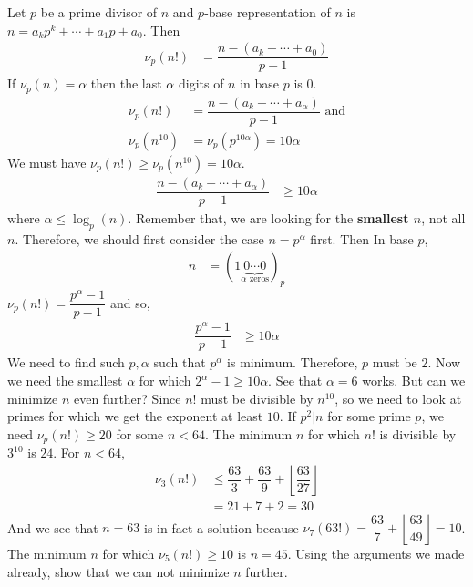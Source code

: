 \documentclass[problems.tex]{subfile}
\begin{document}
	\begin{solution}
		Let $p$ be a prime divisor of $n$ and $p$-base representation of $n$ is $n=a_kp^k+\cdots+a_1p+a_0$. Then
			\begin{align*}
				\nu_p(n!) & = \dfrac{n-(a_k+\cdots+a_0)}{p-1}
			\end{align*}
		If $\nu_p(n)=\alpha $ then the last $\alpha $ digits of $n$ in base $p$ is $0$.
			\begin{align*}
				\nu_p(n!) & = \dfrac{n-(a_k+\cdots+a_{\alpha })}{p-1}\text { and}\\
				\nu_p(n^{10}) & = \nu_p(p^{10\alpha })=10\alpha
			\end{align*}
		We must have $\nu_p(n!)\geq \nu_p(n^{10})=10\alpha$.
			\begin{align*}
				\dfrac{n-(a_k+\cdots+a_\alpha)}{p-1} & \geq10\alpha 
			\end{align*}
		where $\alpha\leq\log_p(n)$. Remember that, we are looking for the \textbf{smallest $n$}, not all $n$. Therefore, we should first consider the case $n=p^\alpha$ first. Then In base $p$,
			\begin{align*}
				n & = (1\underbrace{0\cdots0}_{\alpha\text { zeros}})_p
			\end{align*}
		$\nu_p(n!) = \dfrac{p^\alpha-1}{p-1}$ and so,	
			\begin{align*}
				\dfrac{p^\alpha-1}{p-1} &\geq10\alpha
			\end{align*}
		We need to find such $p,\alpha$ such that $p^\alpha$ is minimum. Therefore, $p$ must be $2$. Now we need the smallest $\alpha$ for which $2^\alpha-1\geq10\alpha $. See that $\alpha = 6$ works. But can we minimize $n$ even further? Since $n!$ must be divisible by $n^{10}$, so we need to look at primes for which we get the exponent at least $10$. If $p^2|n$ for some prime $p$, we need $\nu_p(n!)\geq20$ for some $n<64$. The minimum $n$ for which $n!$ is divisible by $3^{10}$ is $24$. For $n<64$,
			\begin{align*}
				\nu_3(n!) & \leq \dfrac{63}{3}+\dfrac{63}{9}+\left\lfloor\dfrac{63}{27}\right\rfloor\\
						  & = 21+7+2=30
			\end{align*}
		And we see that $n=63$ is in fact a solution because $\nu_7(63!) = \dfrac{63}{7}+\left\lfloor\dfrac{63}{49}\right\rfloor=10$. The minimum $n$ for which $\nu_5(n!)\geq10$ is $n=45$. Using the arguments we made already, show that we can not minimize $n$ further.
	\end{solution}
	
\end{document}
